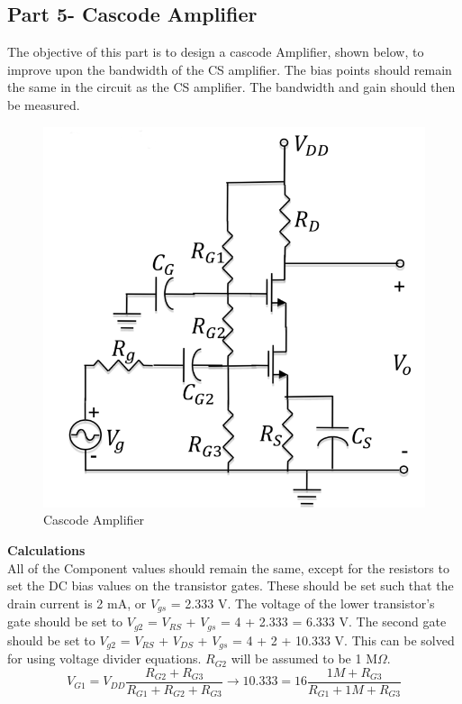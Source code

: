 \documentclass[12pt]{article}
\begin{document}
\subsection*{Part 5- Cascode Amplifier}
The objective of this part is to design a cascode Amplifier, shown below, to improve upon the bandwidth of the CS amplifier. The bias points should remain the same in the circuit as the CS amplifier. The bandwidth and gain should then be measured.
\FloatBarrier
\begin{figure}[h!]
\begin{center}
 \includegraphics[scale=0.23]{./plots/5.png}
\end{center}
\caption{Cascode Amplifier}
\end{figure}
\FloatBarrier
\textbf{Calculations}\\
All of the Component values should remain the same, except for the resistors to set the DC bias values on the transistor gates. These should be set such that the drain current is 2 mA, or $V_{gs}$ = 2.333 V. The voltage of the lower transistor's gate should be set to $V_{g2}$ = $V_{RS}$ + $V_{gs}$ = 4 + 2.333 = 6.333 V. The second gate should be set to $V_{g2}$ = $V_{RS}$ + $V_{DS}$ + $V_{gs}$ = 4 + 2 + 10.333 V. This can be solved for using voltage divider equations. $R_{G2}$ will be assumed to be 1 M$\Omega$.
\begin{equation}
V_{G1} = V_{DD}\frac{R_{G2}+R_{G3}}{R_{G1} + R_{G2}+R_{G3}} \rightarrow 10.333 = 16\frac{1M+R_{G3}}{R_{G1} + 1M+R_{G3}}
\end{equation}
\end{document}
